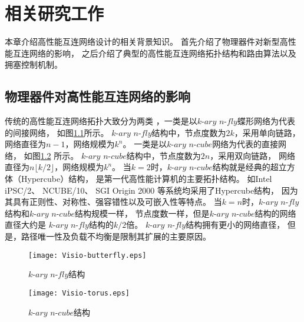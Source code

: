 \chapter{相关研究工作}
本章介绍高性能互连网络设计的相关背景知识。
首先介绍了物理器件对新型高性能互连网络的影响，
之后介绍了典型的高性能互连网络拓扑结构和路由算法以及拥塞控制机制。

\section{物理器件对高性能互连网络的影响}
传统的高性能互连网络拓扑大致分为两类
，一类是以$k\textrm{-}ary$ $n\textrm{-}fly$蝶形网络为代表的间接网络，
如图\ref{butterfly}所示。
$k\textrm{-}ary$ $n\textrm{-}fly$结构中，节点度数为$2k$，采用单向链路，
网络直径为$n-1$，网络规模为$k^n$。
一类是以$k\textrm{-}ary$ $n\textrm{-}cube$网络为代表的直接网络，
如图\ref{torus} 所示。
$k\textrm{-}ary$ $n\textrm{-}cube$结构中，节点度数为$2n$，采用双向链路，
网络直径为$n \lfloor k/2 \rfloor$，网络规模为$k^n$。
当$k=2$时，$k\textrm{-}ary$ $n\textrm{-}cube$结构就是经典的超立方体（Hypercube）结构，
是第一代高性能计算机的主要拓扑结构。
如Intel iPSC/2、 NCUBE/10、
SGI Origin 2000 等系统均采用了Hypercube结构，
因为其具有正则性、对称性、强容错性以及可嵌入性等特点。
当$k=n$时，$k\textrm{-}ary$ $n\textrm{-}fly$结构和$k\textrm{-}ary$ $n\textrm{-}cube$结构规模一样，
节点度数一样，但是$k\textrm{-}ary$ $n\textrm{-}cube$结构的网络直径大约是
$k\textrm{-}ary$ $n\textrm{-}fly$结构的$k/2$倍。
$k\textrm{-}ary$ $n\textrm{-}fly$结构拥有更小的网络直径，
但是，路径唯一性及负载不均衡是限制其扩展的主要原因。

\begin{figure}[htp]
  \centering
   \texttt{[image: Visio-butterfly.eps]}
    \caption{$k\textrm{-}ary$ $n\textrm{-}fly$结构}
    \label{butterfly}
\end{figure}

\begin{figure}[htp]
  \centering
   \texttt{[image: Visio-torus.eps]}
      \caption{$k\textrm{-}ary$ $n\textrm{-}cube$结构}
      \label{torus}
\end{figure}

